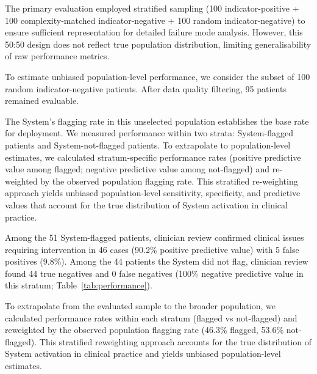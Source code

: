 \label{app:population-performance-assessment}

        The primary evaluation employed stratified sampling (100 indicator-positive + 100 complexity-matched indicator-negative + 100 random indicator-negative) to ensure sufficient representation for detailed failure mode analysis. However, this 50:50 design does not reflect true population distribution, limiting generalisability of raw performance metrics.

        To estimate unbiased population-level performance, we consider the subset of 100 random indicator-negative patients. After data quality filtering, 95 patients remained evaluable.

        The System's flagging rate in this unselected population establishes the base rate for deployment. We measured performance within two strata: System-flagged patients and System-not-flagged patients. To extrapolate to population-level estimates, we calculated stratum-specific performance rates (positive predictive value among flagged; negative predictive value among not-flagged) and re-weighted by the observed population flagging rate. This stratified re-weighting approach yields unbiased population-level sensitivity, specificity, and predictive values that account for the true distribution of System activation in clinical practice.
    
        Among the 51 System-flagged patients, clinician review confirmed clinical issues requiring intervention in 46 cases (90.2\% positive predictive value) with 5 false positives (9.8\%). Among the 44 patients the System did not flag, clinician review found 44 true negatives and 0 false negatives (100\% negative predictive value in this stratum; Table~\ref{tab:performance}).

        To extrapolate from the evaluated sample to the broader population, we calculated performance rates within each stratum (flagged vs not-flagged) and reweighted by the observed population flagging rate (46.3\% flagged, 53.6\% not-flagged). This stratified reweighting approach accounts for the true distribution of System activation in clinical practice and yields unbiased population-level estimates.

